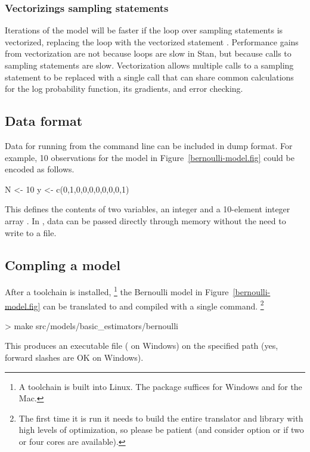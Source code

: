 \documentclass[article]{jss}
\begin{document}
\subsubsection{Vectorizings sampling statements}

Iterations of the model will be faster if the loop over sampling
statements is vectorized, replacing the loop with the vectorized
statement .  Performance gains from
vectorization are not because loops are slow in Stan, but because
calls to sampling statements are slow.  Vectorization allows multiple
calls to a sampling statement to be replaced with a single call that
can share common calculations for the log probability function, its
gradients, and error checking.  

\subsection{Data format}

Data for running  from the command line can be included
in  dump format.  For example, 10 observations for the
model in Figure~\ref{bernoulli-model.fig} could be encoded as follows.
%
\begin{Code}
N <- 10
y <- c(0,1,0,0,0,0,0,0,0,1)
\end{Code}
%
This defines the contents of two variables, an integer  and a
10-element integer array .  In , data can be passed
directly through memory without the need to write to a file.

\subsection{Compling a model}

After a  toolchain is installed,%
%
\footnote{A  toolchain is built into Linux.  The 
   package suffices for Windows and  for the
  Mac.}
%
the Bernoulli model in Figure~\ref{bernoulli-model.fig} can be
translated to  and compiled with a single command.%
%
\footnote{The first time it is run it needs to build the entire
   translator and library with high levels of
  optimization, so please be patient (and consider  option
   or  if two or four cores are available).}
%
\begin{CodeChunk}
\begin{CodeInput}
> make src/models/basic_estimators/bernoulli 
\end{CodeInput}
\end{CodeChunk}
%
This produces an executable file 
( on Windows) on the specified path (yes, forward
slashes are OK on Windows).
\end{document}
